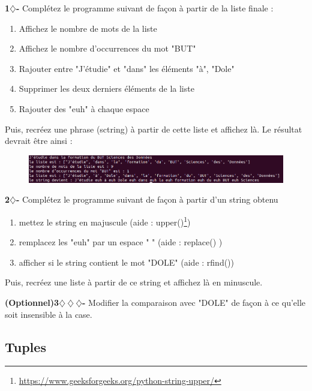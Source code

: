 \begin{tcolorbox}[lefttitle=2cm, colframe=gray!75!black, title= \textbf{Exercices}]
\textbf{1$\diamondsuit$-}
Complétez le programme suivant de façon à partir de la liste finale :

\begin{enumerate}
    \item Affichez le nombre de mots de la liste
    \item Affichez le nombre d’occurrences du mot "BUT"
    \item Rajouter entre "J'étudie" et "dans" les éléments "à", "Dole"
    \item Supprimer les deux derniers éléments de la liste
    \item Rajouter des "euh" à chaque espace 
\end{enumerate}

Puis, recréez une phrase (sctring) à partir de cette liste et affichez là.
Le résultat devrait être ainsi :
\begin{figure}[H]
    \centering
    \includegraphics[scale = 0.4]{chapitre2/figures/string2.png}
\end{figure}


\textbf{2$\diamondsuit$-}
Complétez le programme suivant de façon à partir d'un string obtenu

\begin{enumerate}
    \item mettez le string en majuscule (aide : upper()\footnote{\url{https://www.geeksforgeeks.org/python-string-upper/}})
    \item remplacez les "euh" par un espace " " (aide : replace() )
    \item afficher si le string contient le mot "DOLE" (aide : rfind())
\end{enumerate}

Puis, recréez une liste à partir de ce string et affichez là en minuscule.

\textbf{(Optionnel)3$\diamondsuit~\diamondsuit~\diamondsuit$-}
Modifier la comparaison avec "DOLE" de façon à ce qu'elle soit insensible à la case.

\end{tcolorbox}



\subsection{Tuples}

